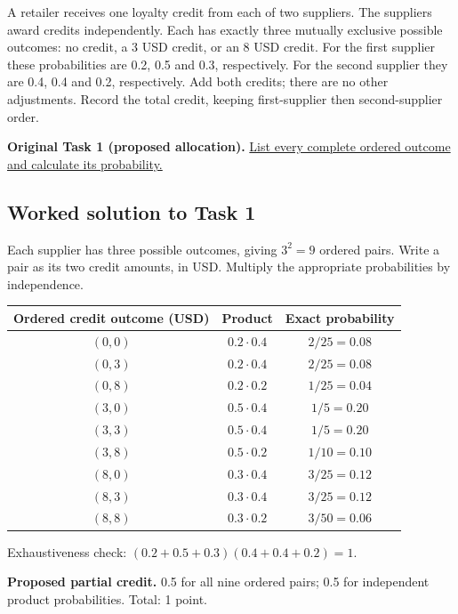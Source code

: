 \clearpage
{}

A retailer receives one loyalty credit from each of two suppliers. The suppliers award credits independently. Each has exactly three mutually exclusive possible outcomes: no credit, a 3 USD credit, or an 8 USD credit. For the first supplier these probabilities are 0.2, 0.5 and 0.3, respectively. For the second supplier they are 0.4, 0.4 and 0.2, respectively. Add both credits; there are no other adjustments. Record the total credit, keeping first-supplier then second-supplier order.

\textbf{Original Task 1 (proposed allocation).} \hyperref[sol:q2t1]{List every complete ordered outcome and calculate its probability.} 


\subsection*{Worked solution to Task 1 }
\label{sol:q2t1}

Each supplier has three possible outcomes, giving $3^2=9$ ordered pairs. Write a pair as its two credit amounts, in USD. Multiply the appropriate probabilities by independence.

\begin{center}
\begin{tabular}{ccc}\toprule
Ordered credit outcome (USD) & Product & Exact probability\\\midrule
$(0,0)$ & $0.2\cdot0.4$ & $2/25=0.08$\\
$(0,3)$ & $0.2\cdot0.4$ & $2/25=0.08$\\
$(0,8)$ & $0.2\cdot0.2$ & $1/25=0.04$\\
$(3,0)$ & $0.5\cdot0.4$ & $1/5=0.20$\\
$(3,3)$ & $0.5\cdot0.4$ & $1/5=0.20$\\
$(3,8)$ & $0.5\cdot0.2$ & $1/10=0.10$\\
$(8,0)$ & $0.3\cdot0.4$ & $3/25=0.12$\\
$(8,3)$ & $0.3\cdot0.4$ & $3/25=0.12$\\
$(8,8)$ & $0.3\cdot0.2$ & $3/50=0.06$\\
\bottomrule\end{tabular}
\end{center}


Exhaustiveness check: $(0.2+0.5+0.3)(0.4+0.4+0.2)=1$.

\textbf{Proposed partial credit.} 0.5 for all nine ordered pairs; 0.5 for independent product probabilities. Total: 1 point.


